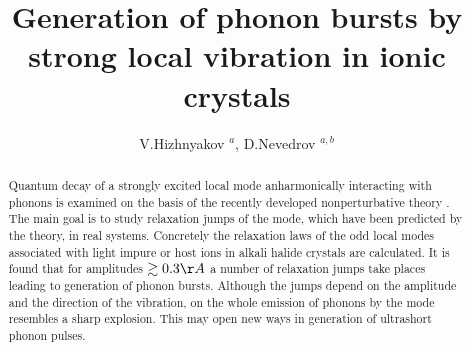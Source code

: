 \title{Generation of phonon bursts by strong local vibration in ionic crystals}
\author{V.Hizhnyakov $^{a}$, D.Nevedrov $^{a,b}$}
\address{$^{a}$Institute of Theoretical Physics,
University of Tartu, T\"{a}he 4, Tartu EE2400, Estonia.\\ 
$^{b}$NORDITA, Blegdamsvej 17, Copenhagen DK-2100, Denmark.\\
e-mail: hizh@fi.tartu.ee}

\maketitle
\begin{center}

\end{center}

\begin{abstract}
Quantum decay of a strongly excited local mode anharmonically interacting with
phonons is examined on the basis of the recently developed nonperturbative 
theory \cite{hizhrev}. The main goal is to study relaxation jumps of the mode,
which have been predicted by the theory, in real systems. Concretely the 
relaxation laws of the odd local modes associated with light impure or host 
ions in alkali halide crystals are calculated. It is found that for amplitudes
$\gtrsim 0.3 \AA$ a number of relaxation jumps take places leading to 
generation of phonon bursts. Although the jumps depend on the amplitude and 
the direction of the vibration, on the whole emission of phonons by the mode 
resembles a sharp explosion. This may open new ways in generation of ultrashort
phonon pulses.  
\end{abstract}

